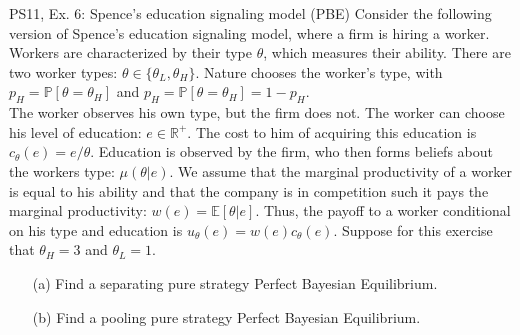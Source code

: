 \begin{frame}{PS11, Ex. 6: Spence’s education signaling model (PBE)}
    Consider the following version of Spence’s education signaling model, where a firm is hiring a worker. Workers are characterized by their type $\theta$, which measures their ability. There are two worker types: $\theta\in\{\theta_L,\theta_H\}$. Nature chooses the worker’s type, with $p_H = \mathbb{P}[\theta = \theta_H]$ and $p_H = \mathbb{P}[\theta = \theta_H]=1-p_H$.\\\smallskip
    The worker observes his own type, but the firm does not. The worker can choose his level of education: $e\in\mathbb{R}^{+}$. The cost to him of acquiring this education is $c_\theta(e) = e/\theta$. Education is observed by the firm, who then forms beliefs about the workers type: $\mu(\theta|e)$. We assume that the marginal productivity of a worker is equal to his ability and that the company is in competition such it pays the marginal productivity: $w(e) = \mathbb{E}[\theta|e]$. Thus, the payoff to a worker conditional on his type and education is $u_\theta(e)=w(e)c_\theta(e)$. Suppose for this exercise that $\theta_H=3$ and $\theta_L=1$.\vspace{-4pt}
    \begin{itemize}
      \item[(a)] Find a separating pure strategy Perfect Bayesian Equilibrium.
      \item[(b)] Find a pooling pure strategy Perfect Bayesian Equilibrium.
    \end{itemize}
    \begin{multicols}{2}
      \vfill\null\columnbreak
      \vfill\null
    \end{multicols}
\end{frame}
